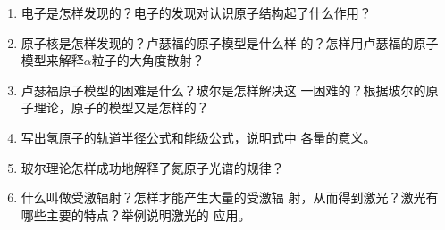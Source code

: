 \begin{enumerate}
    \item 电子是怎样发现的？电子的发现对认识原子结构起了什么作用？
    \item 原子核是怎样发现的？卢瑟福的原子模型是什么样
的？怎样用卢瑟福的原子模型来解释$\alpha$粒子的大角度散射？
\item 卢瑟福原子模型的困难是什么？玻尔是怎样解决这
一困难的？根据玻尔的原子理论，原子的模型又是怎样的？
\item 写出氢原子的轨道半径公式和能级公式，说明式中
各量的意义。
\item 玻尔理论怎样成功地解释了氮原子光谱的规律？
\item 什么叫做受激辐射？怎样才能产生大量的受激辐
射，从而得到激光？激光有哪些主要的特点？举例说明激光的
应用。
\end{enumerate}


































